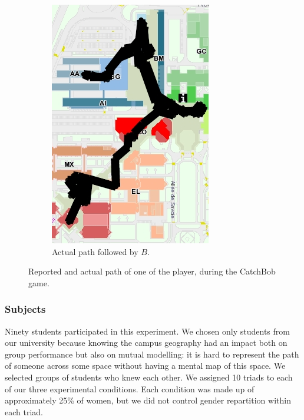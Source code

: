 \documentclass[twocolumn]{article}
\begin{document}
\begin{figure}[h!t]
\begin{subfigure}{.3\textwidth}
            \includegraphics[width=\linewidth]{image7.png}
            \caption{Actual path followed by $B$.}
        \end{subfigure}
        \caption{Reported and actual path of one of the player, during the {\sc
        CatchBob} game.}
        \label{study2:paths}
\end{figure}

\subsubsection*{Subjects}

Ninety students participated in this experiment. We chosen only students from
our university because knowing the campus geography had an impact both on group
performance but also on mutual modelling: it is hard to represent the path of
someone across some space without having a mental map of this space. We selected
groups of students who knew each other. We assigned 10 triads to each of our
three experimental conditions. Each condition was made up of approximately 25\%
of women, but we did not control gender repartition within each triad.
\end{document}
